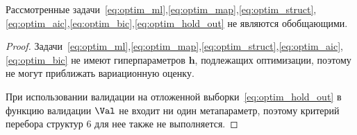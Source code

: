 \begin{theorem}Рассмотренные задачи~\eqref{eq:optim_ml},\eqref{eq:optim_map},\eqref{eq:optim_struct},\eqref{eq:optim_aic},\eqref{eq:optim_bic},\eqref{eq:optim_hold_out} не являются обобщающими.
\end{theorem}
\begin{proof}
Задачи~\eqref{eq:optim_ml},\eqref{eq:optim_map},\eqref{eq:optim_struct},\eqref{eq:optim_aic},\eqref{eq:optim_bic} не имеют гиперпараметров $\mathbf{h}$, подлежащих оптимизации, поэтому не могут приближать вариационную оценку.

При  использовании валидации на отложенной выборки~\eqref{eq:optim_hold_out} в функцию валидации $\Val$ не входит ни один метапараметр, поэтому критерий перебора структур 6 для нее также не выполняется. 

\end{proof}

